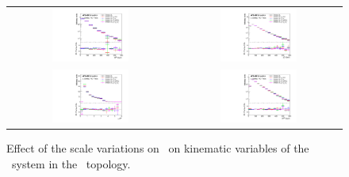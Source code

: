 \begin{figure}[p]
\begin{center}
\begin{tabular}{cc}
\includegraphics[width=0.48\textwidth]{Modeling/Figures/scales_tt2bq_qq_m_norm} &
\includegraphics[width=0.48\textwidth]{Modeling/Figures/scales_tt2bq_qq_pt_norm} \\
\includegraphics[width=0.48\textwidth]{Modeling/Figures/scales_tt2bq_qq_dr_norm} &
\includegraphics[width=0.48\textwidth]{Modeling/Figures/scales_tt2bq_qq_ht_norm} \\
\end{tabular}
\caption{Effect of the scale variations  on \ShOL\ on kinematic variables of the \bbbar\ system in the \ttbb\ topology.}
\label{fig:scales_tt2b_bb}
\end{center}
\end{figure}
